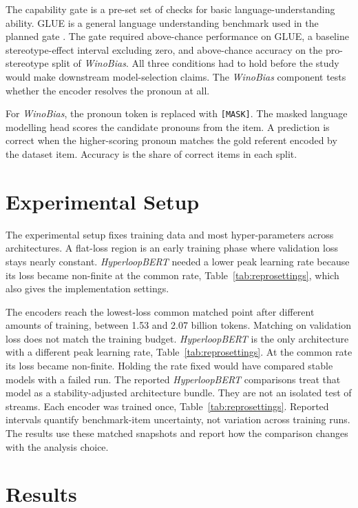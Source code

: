 \documentclass[sigconf,natbib=true,anonymous=true]{acmart}
\begin{document}
\label{sec:gate}
The capability gate is a pre-set set of checks for basic language-understanding
ability. GLUE is a general language understanding benchmark used in the planned
gate \citep{wang2018glue}. The gate required above-chance performance on GLUE, a
baseline stereotype-effect interval excluding zero, and above-chance accuracy on
the pro-stereotype split of \emph{WinoBias}. All three conditions had to hold
before the study would make downstream model-selection claims. The
\emph{WinoBias} component tests whether the encoder resolves the pronoun at all.

For \emph{WinoBias}, the pronoun token is replaced with \texttt{[MASK]}. The
masked language modelling head scores the candidate pronouns from the item. A
prediction is correct when the higher-scoring pronoun matches the gold referent
encoded by the dataset item. Accuracy is the share of correct items in each
split.

\section{Experimental Setup}
\label{sec:setup}

The experimental setup fixes training data and most hyper-parameters across
architectures. A flat-loss region is an early training phase where validation
loss stays nearly constant. \emph{HyperloopBERT} needed a lower peak learning
rate because its loss became non-finite at the common rate,
Table~\ref{tab:reprosettings}, which also gives the implementation settings.

The encoders reach the lowest-loss common matched point after different amounts
of training, between 1.53 and 2.07 billion tokens. Matching on validation loss
does not match the training budget. \emph{HyperloopBERT} is the only architecture
with a different peak learning rate, Table~\ref{tab:reprosettings}. At the
common rate its loss became non-finite. Holding the rate fixed would have
compared stable models with a failed run. The reported \emph{HyperloopBERT}
comparisons treat that model as a stability-adjusted architecture
bundle. They are not an isolated test of streams. Each encoder was trained once,
Table~\ref{tab:reprosettings}. Reported intervals quantify benchmark-item
uncertainty, not variation across training runs. The results use these matched
snapshots and report how the comparison changes with the analysis choice.

\section{Results}
\label{sec:results}
\end{document}
